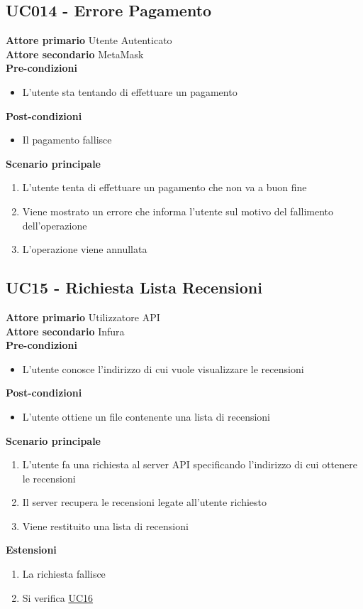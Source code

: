 \subsection{UC014 - Errore Pagamento}
\label{UC14}
\textbf{Attore primario} Utente Autenticato \\
\textbf{Attore secondario} MetaMask \\
\textbf{Pre-condizioni}
\begin{itemize}
    \item L'utente sta tentando di effettuare un pagamento
\end{itemize}
\textbf{Post-condizioni}
\begin{itemize}
    \item Il pagamento fallisce
\end{itemize}
\textbf{Scenario principale}
\begin{enumerate}
    \item L'utente tenta di effettuare un pagamento che non va a buon fine
    \item Viene mostrato un errore che informa l'utente sul motivo del fallimento
          dell'operazione
    \item L'operazione viene annullata
\end{enumerate}

\subsection{UC15 - Richiesta Lista Recensioni}
\textbf{Attore primario} Utilizzatore API \\
\textbf{Attore secondario} Infura \\
\textbf{Pre-condizioni}
\begin{itemize}
    \item L'utente conosce l'indirizzo di cui vuole visualizzare le recensioni
\end{itemize}
\textbf{Post-condizioni}
\begin{itemize}
    \item L'utente ottiene un file contenente una lista di recensioni
\end{itemize}
\textbf{Scenario principale}
\begin{enumerate}
    \item L'utente fa una richiesta al server API specificando l'indirizzo di cui
          ottenere le recensioni
    \item Il server recupera le recensioni legate all'utente richiesto
    \item Viene restituito una lista di recensioni
\end{enumerate}
\textbf{Estensioni}
\begin{enumerate}
    \item La richiesta fallisce
    \item Si verifica \hyperref[UC16]{UC16}
\end{enumerate}

